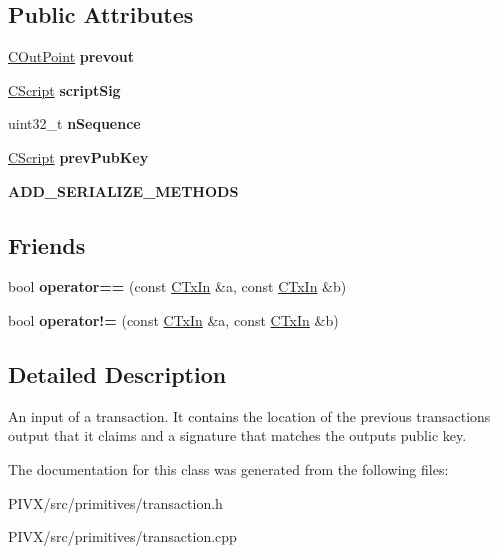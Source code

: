\subsection*{Public Attributes}
\begin{DoxyCompactItemize}
\item 
\mbox{\label{class_c_tx_in_aed9312051a25380cbd7f123408ab7c20}} 
\mbox{\hyperlink{class_c_out_point}{C\+Out\+Point}} {\bfseries prevout}
\item 
\mbox{\label{class_c_tx_in_aba540fd902366210a6ad6cd9a18fe763}} 
\mbox{\hyperlink{class_c_script}{C\+Script}} {\bfseries script\+Sig}
\item 
\mbox{\label{class_c_tx_in_a635deeaf3ca4e8b3e1a97054607211b9}} 
uint32\+\_\+t {\bfseries n\+Sequence}
\item 
\mbox{\label{class_c_tx_in_a91732c5ffb13520a6989b162ff6683fc}} 
\mbox{\hyperlink{class_c_script}{C\+Script}} {\bfseries prev\+Pub\+Key}
\item 
\mbox{\label{class_c_tx_in_aad2fd3fef5ad4ebe7e54c0db0cc34be4}} 
{\bfseries A\+D\+D\+\_\+\+S\+E\+R\+I\+A\+L\+I\+Z\+E\+\_\+\+M\+E\+T\+H\+O\+DS}
\end{DoxyCompactItemize}
\subsection*{Friends}
\begin{DoxyCompactItemize}
\item 
\mbox{\label{class_c_tx_in_a1bb37c4cd8573c3014a194e8ce4d8daa}} 
bool {\bfseries operator==} (const \mbox{\hyperlink{class_c_tx_in}{C\+Tx\+In}} \&a, const \mbox{\hyperlink{class_c_tx_in}{C\+Tx\+In}} \&b)
\item 
\mbox{\label{class_c_tx_in_a4188c5f0807185c03e80598a7a3ace72}} 
bool {\bfseries operator!=} (const \mbox{\hyperlink{class_c_tx_in}{C\+Tx\+In}} \&a, const \mbox{\hyperlink{class_c_tx_in}{C\+Tx\+In}} \&b)
\end{DoxyCompactItemize}


\subsection{Detailed Description}
An input of a transaction. It contains the location of the previous transaction\textquotesingle{}s output that it claims and a signature that matches the output\textquotesingle{}s public key. 

The documentation for this class was generated from the following files\+:\begin{DoxyCompactItemize}
\item 
P\+I\+V\+X/src/primitives/transaction.\+h\item 
P\+I\+V\+X/src/primitives/transaction.\+cpp\end{DoxyCompactItemize}
